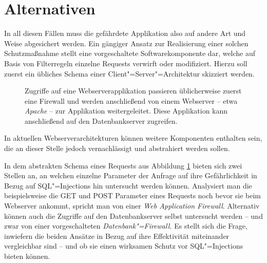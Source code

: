 \section{Alternativen}
In all diesen Fällen muss die gefährdete Applikation also auf andere Art und Weise abgesichert werden. Ein gängiger Ansatz zur Realisierung einer solchen Schutzmaßnahme stellt eine vorgeschaltete Softwarekomponente dar, welche auf Basis von Filterregeln einzelne Requests verwirft oder modifiziert. Hierzu soll zuerst ein übliches Schema einer Client"=Server"=Architektur skizziert werden.

\begin{figure}[ht!]
\begin{margincap}
\centering
{}
\caption{Zugriffe auf eine Webserverapplikation passieren üblicherweise zuerst eine Firewall und werden anschließend von einem Webserver -- etwa \emph{Apache} -- zur Applikation weitergeleitet. Diese Applikation kann anschließend auf den Datenbankserver zugreifen.}
\label{img:server_arch}
\end{margincap}
\end{figure}


In aktuellen Webserverarchitekturen können weitere Komponenten enthalten sein, die an dieser Stelle jedoch vernachlässigt und abstrahiert werden sollen.

In dem abstrakten Schema eines Requests aus Abbildung \ref{img:server_arch} bieten sich zwei Stellen an, an welchen einzelne Parameter der Anfrage auf ihre Gefährlichkeit in Bezug auf SQL"=Injections hin untersucht werden können. Analysiert man die beispielsweise die GET und POST Parameter eines Requests noch bevor sie beim Webserver ankommt, spricht man von einer \emph{Web Application Firewall}. Alternativ können auch die Zugriffe auf den Datenbankserver selbst untersucht werden -- und zwar von einer vorgeschalteten \emph{Datenbank"=Firewall.} Es stellt sich die Frage, inwiefern die beiden Ansätze in Bezug auf ihre Effektivität miteinander vergleichbar sind -- und ob sie einen wirksamen Schutz vor SQL"=Injections bieten können.


